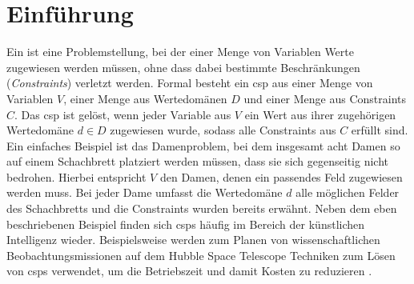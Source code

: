 \section{Einführung}
Ein  ist eine Problemstellung, bei der einer Menge von Variablen Werte zugewiesen werden müssen, ohne dass dabei bestimmte Beschränkungen (\textit{Constraints}) 
verletzt werden. Formal besteht ein \ac*{csp} aus einer Menge von Variablen $V$, einer Menge aus Wertedomänen $D$ und einer Menge aus Constraints $C$. Das \ac*{csp} ist gelöst,
wenn jeder Variable aus $V$ ein Wert aus ihrer zugehörigen Wertedomäne $d \in D$ zugewiesen wurde, sodass alle Constraints aus $C$ erfüllt sind. Ein einfaches Beispiel ist das
Damenproblem, bei dem insgesamt acht Damen so auf einem Schachbrett platziert werden müssen, dass sie sich gegenseitig nicht bedrohen. Hierbei entspricht $V$ den Damen, denen
ein passendes Feld zugewiesen werden muss. Bei jeder Dame umfasst die Wertedomäne $d$ alle möglichen Felder des Schachbretts und die Constraints wurden bereits erwähnt. Neben
dem eben beschriebenen Beispiel finden sich \acp{csp} häufig im Bereich der künstlichen Intelligenz wieder. Beispielsweise werden zum Planen von wissenschaftlichen
Beobachtungsmissionen auf dem Hubble Space Telescope Techniken zum Lösen von \acp{csp} verwendet, um die Betriebszeit und damit Kosten zu reduzieren \cite{HubbleScheduling}.
